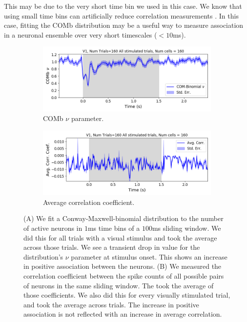   This may be due to the very short time bin we used in this case. We know that using small time bins can artificially reduce correlation measurements  \parencite{cohen2}. In this case, fitting the COMb distribution may be a useful way to measure association in a neuronal ensemble over very short timescales ($<10$ms).

  \begin{figure}[h]
    \begin{subfigure}[h]{\linewidth}
      \includegraphics[width=\linewidth]{figures/conway_maxwell/v1_1ms_comb_nu_all_stimulated_trials.png}
      \caption{COMb $\nu$ parameter.}
      \label{fig:comb_nu_parameter}
    \end{subfigure}
    \begin{subfigure}[h]{\linewidth}
      \includegraphics[width=\linewidth]{figures/conway_maxwell/v1_1ms_corr_avg_all_stimulated_trials.png}
      \caption{Average correlation coefficient.}
      \label{fig:avg_corr_coef}
    \end{subfigure}
    \caption{(A) We fit a Conway-Maxwell-binomial distribution to the number of active neurons in $1$ms time bins of a $100$ms sliding window. We did this for all trials with a visual stimulus and took the average across those trials. We see a transient drop in value for the distribution's $\nu$ parameter at stimulus onset. This shows an increase in positive association between the neurons. (B) We measured the correlation coefficient between the spike counts of all possible pairs of neurons in the same sliding window. The took the average of those coefficients. We also did this for every visually stimulated trial, and took the average across trials. The increase in positive association is not reflected with an increase in average correlation.}
    \label{fig:comb_nu_and_corr}
  \end{figure}

